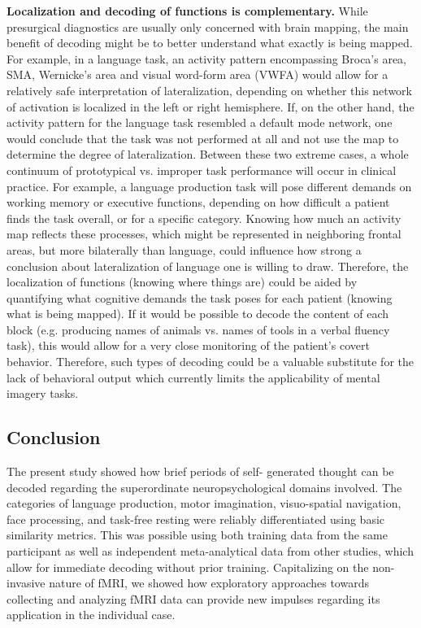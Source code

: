 \documentclass[fleqn,10pt]{SelfArx} %
\begin{document}
\textbf{Localization and decoding of functions is complementary.} While presurgical diagnostics are usually only concerned with brain mapping, the main benefit of decoding might be to better understand what exactly is being mapped. For example, in a language task, an activity pattern encompassing Broca's area, SMA, Wernicke's area and visual word-form area (VWFA) would allow for a relatively safe interpretation of lateralization, depending on whether this network of activation is localized in the left or right hemisphere. If, on the other hand, the activity pattern for the language task resembled a default mode network, one would conclude that the task was not performed at all and not use the map to determine the degree of lateralization. Between these two extreme cases, a whole continuum of prototypical vs. improper task performance will occur in clinical practice. For example, a language production task will pose different demands on working memory or executive functions, depending on how difficult a patient finds the task overall, or for a specific category. Knowing how much an activity map reflects these processes, which might be represented in neighboring frontal areas, but more bilaterally than language, could influence how strong a conclusion about lateralization of language one is willing to draw. Therefore, the localization of functions (knowing where things are) could be aided by quantifying what cognitive demands the task poses for each patient (knowing what is being mapped). If it would be possible to decode the content of each block (e.g. producing names of animals vs. names of tools in a verbal fluency task), this would allow for a very close monitoring of the patient’s covert behavior. Therefore, such types of decoding could be a valuable substitute for the lack of behavioral output which currently limits the applicability of mental imagery tasks.

\subsection*{Conclusion}
The present study showed how brief periods of self- generated thought can be decoded regarding the superordinate neuropsychological domains involved. The categories of language production, motor imagination, visuo-spatial navigation, face processing, and task-free resting were reliably differentiated using basic similarity metrics. This was possible using both training data from the same participant as well as independent meta-analytical data from other studies, which allow for immediate decoding without prior training. Capitalizing on the non-invasive nature of fMRI, we showed how exploratory approaches towards collecting and analyzing fMRI data can provide new impulses regarding its application in the individual case.
\end{document}
